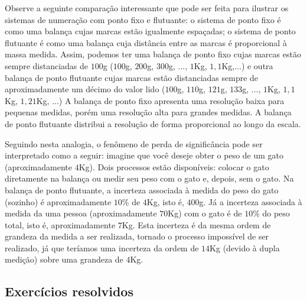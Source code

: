\begin{ex} Observe a seguinte comparação interessante que pode ser feita para ilustrar os sistemas de numeração com ponto fixo e flutuante: o sistema de ponto fixo é como uma balança cujas marcas estão igualmente espaçadas; o sistema de ponto flutuante é como uma balança cuja distância entre as marcas é proporcional à massa medida. Assim, podemos ter uma balança de ponto fixo cujas marcas estão sempre distanciadas de $100$g ($100$g, $200$g, $300$g, ..., $1$Kg, $1,1$Kg,...) e outra balança de ponto flutuante cujas marcas estão distanciadas sempre de aproximadamente um décimo do valor lido ($100$g, $110$g, $121$g, $133$g, ..., $1$Kg, $1,1$Kg, $1,21$Kg, ...) A balança de ponto fixo apresenta uma resolução baixa para pequenas medidas, porém uma resolução alta para grandes medidas. A balança de ponto flutuante distribui a resolução de forma proporcional ao longo da escala.

Seguindo nesta analogia, o fenômeno de perda de significância pode ser interpretado como a seguir: imagine que você deseje obter o peso de um gato (aproximadamente $4$Kg). Dois processos estão disponíveis: colocar o gato diretamente na balança ou medir seu peso com o gato e, depois, sem o gato. Na balança de ponto flutuante, a incerteza associada à medida do peso do gato (sozinho) é aproximadamente $10\%$ de $4$Kg, isto é, $400$g. Já a incerteza associada à medida da uma pessoa (aproximadamente $70$Kg) com o gato é de $10\%$ do peso total, isto é, aproximadamente $7$Kg. Esta incerteza é da mesma ordem de grandeza da medida a ser realizada, tornado o processo impossível de ser realizado, já que teríamos uma incerteza da ordem de $14$Kg (devido à dupla medição) sobre uma grandeza de $4$Kg.
\end{ex}

\subsection*{Exercícios resolvidos}


